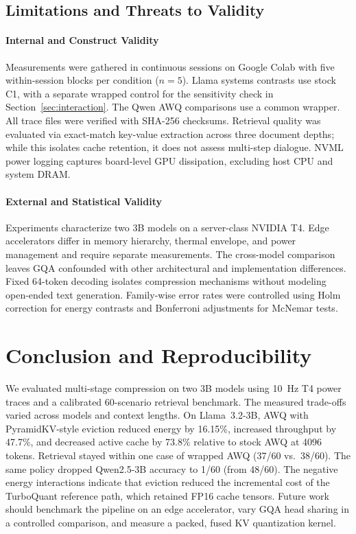 \documentclass[conference,a4paper]{IEEEtran}
\begin{document}
\subsection{Limitations and Threats to Validity}
\paragraph{Internal and Construct Validity} Measurements were gathered in continuous sessions on Google Colab with five within-session blocks per condition ($n=5$). Llama systems contrasts use stock C1, with a separate wrapped control for the sensitivity check in Section~\ref{sec:interaction}. The Qwen AWQ comparisons use a common wrapper. All trace files were verified with SHA-256 checksums. Retrieval quality was evaluated via exact-match key-value extraction across three document depths; while this isolates cache retention, it does not assess multi-step dialogue. NVML power logging captures board-level GPU dissipation, excluding host CPU and system DRAM.
\paragraph{External and Statistical Validity} Experiments characterize two 3B models on a server-class NVIDIA T4. Edge accelerators differ in memory hierarchy, thermal envelope, and power management and require separate measurements. The cross-model comparison leaves GQA confounded with other architectural and implementation differences. Fixed 64-token decoding isolates compression mechanisms without modeling open-ended text generation. Family-wise error rates were controlled using Holm correction for energy contrasts and Bonferroni adjustments for McNemar tests.

\section{Conclusion and Reproducibility}

We evaluated multi-stage compression on two 3B models using 10~Hz T4 power traces and a calibrated 60-scenario retrieval benchmark. The measured trade-offs varied across models and context lengths. On Llama~3.2-3B, AWQ with PyramidKV-style eviction reduced energy by 16.15\%, increased throughput by 47.7\%, and decreased active cache by 73.8\% relative to stock AWQ at 4096 tokens. Retrieval stayed within one case of wrapped AWQ (37/60 vs.\ 38/60). The same policy dropped Qwen2.5-3B accuracy to 1/60 (from 48/60). The negative energy interactions indicate that eviction reduced the incremental cost of the TurboQuant reference path, which retained FP16 cache tensors. Future work should benchmark the pipeline on an edge accelerator, vary GQA head sharing in a controlled comparison, and measure a packed, fused KV quantization kernel.
\end{document}
